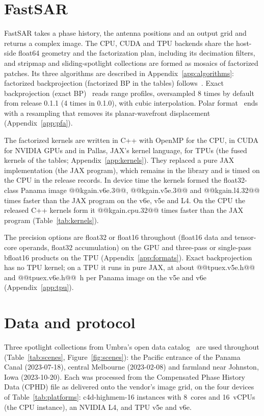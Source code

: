 \documentclass[11pt]{article}
\begin{document}
\section{FastSAR}
\label{sec:fastsar}

FastSAR takes a phase history, the antenna positions and an output grid and returns a complex image. The CPU, CUDA and TPU backends share the host-side float64 geometry and the factorization plan, including its decimation filters, and stripmap and sliding-spotlight collections are formed as mosaics of factorized patches. Its three algorithms are described in Appendix~\ref{app:algorithms}: factorized backprojection (factorized BP in the tables) follows~\cite{mccorkle1996,ulander2003}. Exact backprojection (exact BP)~\cite{gorham2010} reads range profiles, oversampled 8 times by default from release 0.1.1 (4 times in 0.1.0), with cubic interpolation. Polar format~\cite{carrara1995,jakowatz1996} ends with a resampling that removes its planar-wavefront displacement (Appendix~\ref{app:pfa}).

The factorized kernels are written in C++ with OpenMP for the CPU, in CUDA for NVIDIA GPUs and in Pallas, JAX's kernel language, for TPUs (the fused kernels of the tables; Appendix~\ref{app:kernels}). They replaced a pure JAX implementation (the JAX program), which remains in the library and is timed on the CPU in the release records. In device time the kernels formed the float32-class Panama image @@kgain.v6e.3@@, @@kgain.v5e.3@@ and @@kgain.l4.32@@ times faster than the JAX program on the v6e, v5e and L4. On the CPU the released C++ kernels form it @@kgain.cpu.32@@ times faster than the JAX program (Table~\ref{tab:kernels}). 

The precision options are float32 or float16 throughout (float16 data and tensor-core operands, float32 accumulation) on the GPU and three-pass or single-pass bfloat16 products on the TPU (Appendix~\ref{app:formats}). Exact backprojection has no TPU kernel; on a TPU it runs in pure JAX, at about @@tpuex.v5e.h@@ and @@tpuex.v6e.h@@~h per Panama image on the v5e and v6e (Appendix~\ref{app:tpu}).

\section{Data and protocol}
\label{sec:protocol}

Three spotlight collections from Umbra's open data catalog~\cite{umbra2023} are used throughout (Table~\ref{tab:scenes}, Figure~\ref{fig:scenes}): the Pacific entrance of the Panama Canal (2023-07-18), central Melbourne (2023-02-08) and farmland near Johnston, Iowa (2023-10-20). Each was processed from the Compensated Phase History Data (CPHD) file as delivered onto the vendor's image grid, on the four devices of Table~\ref{tab:platforms}: c4d-highmem-16 instances with 8~cores and 16~vCPUs (the CPU instance), an NVIDIA L4, and TPU v5e and v6e.
\end{document}
